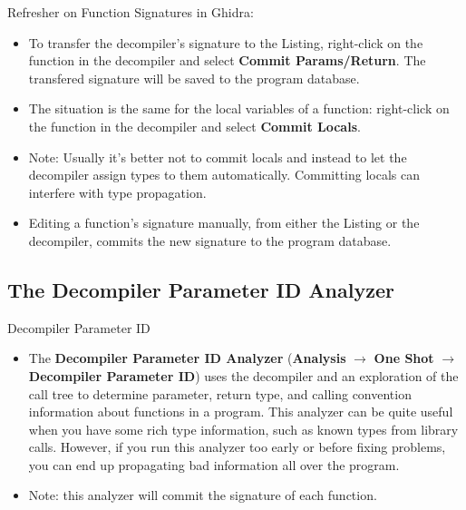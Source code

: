 \documentclass{beamer}
\begin{document}
\begin{frame}
\begin{block}{Refresher on Function Signatures in Ghidra:}
\begin{itemize}
\item To transfer the decompiler's signature to the Listing, right-click on the function in the decompiler and select \textbf{Commit Params/Return}. The transfered signature will be
saved to the program database.
\item The situation is the same for the local variables of a function: right-click on the function in the decompiler and select \textbf{Commit Locals}.
\item[] Note: Usually it's better not to commit locals and instead to let the decompiler assign types to them automatically.  Committing locals can
interfere with type propagation.
\item Editing a function's signature manually, from either the Listing or the decompiler, commits the new signature to the program database.
\end{itemize}
\end{block}
\end{frame}

\subsection{The Decompiler Parameter ID Analyzer}
\begin{frame}
\begin{block}{Decompiler Parameter ID}
\begin{itemize}
\item The \textbf{Decompiler Parameter ID Analyzer} (\textbf{Analysis} $\rightarrow$ \textbf{One Shot} $\rightarrow$ \textbf{Decompiler Parameter ID}) uses the decompiler and an
exploration of the call tree to determine parameter, return type, and calling convention information about functions in a program.  This analyzer can be quite useful when
you have some rich type information, such as known types from library calls.  However, if you run this analyzer too early or before fixing problems, you can end up propagating
bad information all over the program.
\item Note: this analyzer will commit the signature of each function.
\end{itemize}
\end{block}
\end{frame}
\end{document}
